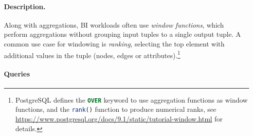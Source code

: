 
\paragraph{Description.}

Along with aggregations, BI workloads often use \emph{window functions},
which perform aggregations without grouping input tuples to a single output
tuple.  A common use case for windowing is \emph{ranking}, \ie selecting the top
element with additional values in the tuple (nodes, edges or
attributes).\footnote{PostgreSQL defines the \lstinline[language=sql]{OVER}
    keyword to use aggregation functions as window functions, and the
    \lstinline[language=sql]{rank()} function to produce numerical ranks, see
    \url{https://www.postgresql.org/docs/9.1/static/tutorial-window.html} for
    details.}


\paragraph{Queries}
{\raggedright

}